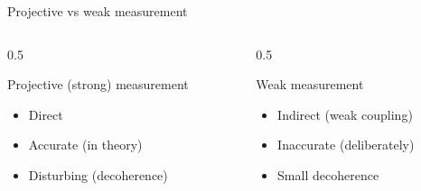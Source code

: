 \documentclass{beamer}
\begin{document}
	
	\begin{frame}{Projective vs weak measurement}

		\vspace{-0.4cm}
		
		\begin{columns}
			
			\begin{column}{0.5\textwidth}
				\begin{block}{Projective (strong) measurement}
				
					\begin{itemize}
						\item Direct
						\item Accurate (in theory)
						\item Disturbing (decoherence)
					\end{itemize}
					\begin{center}
						\begin{figure}[height=2cm]
						\end{figure}
					\end{center}
				\end{block}
			\end{column}
			
			
			\begin{column}{0.5\textwidth}
				\begin{block}{Weak measurement}
					\begin{itemize}
						\item Indirect (weak coupling)
						\item Inaccurate (deliberately)
						\item Small decoherence
					\end{itemize}
					\begin{center}
					\end{center}	
				\end{block}
			\end{column}
		

\end{columns}
\end{frame}
\end{document}
